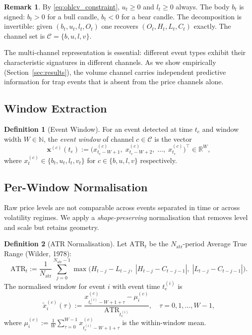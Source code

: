 \documentclass[11pt,a4paper]{article}
\theoremstyle{definition}
\newtheorem{definition}{Definition}[section]
\newtheorem{remark}{Remark}[section]
\theoremstyle{plain}
\newcommand{\R}{\mathbb{R}}
\newcommand{\N}{\mathbb{N}}
\newcommand{\bvec}[1]{\mathbf{#1}}
\begin{document}
\begin{remark}
By \eqref{eq:ohlcv_constraint}, $u_t \geq 0$ and $l_t \geq 0$ always. The
body $b_t$ is signed: $b_t > 0$ for a bull candle, $b_t < 0$ for a bear
candle. The decomposition is invertible: given $(b_t, u_t, l_t, O_t)$ one
recovers $(O_t, H_t, L_t, C_t)$ exactly. The channel set is
$\mathcal{C} = \{b, u, l, v\}$.
\end{remark}

The multi-channel representation is essential: different event types exhibit
their characteristic signatures in different channels. As we show
empirically (Section~\ref{sec:results}), the volume channel carries
independent predictive information for trap events that is absent from the
price channels alone.

\subsection{Window Extraction}

\begin{definition}[Event Window]
\label{def:window}
For an event detected at time $t_e$ and window width $W \in \N$, the
\emph{event window} of channel $c \in \mathcal{C}$ is the vector
\begin{equation}
    \bvec{x}^{(c)}(t_e) :=
    \bigl(x^{(c)}_{t_e - W + 1},\;
          x^{(c)}_{t_e - W + 2},\;
          \ldots,\;
          x^{(c)}_{t_e}\bigr)^\top
    \in \R^W,
    \label{eq:window_vector}
\end{equation}
where $x^{(c)}_t \in \{b_t, u_t, l_t, v_t\}$ for $c \in \{b, u, l, v\}$
respectively.
\end{definition}

\subsection{Per-Window Normalisation}
\label{sec:normalisation}

Raw price levels are not comparable across events separated in time or
across volatility regimes. We apply a \emph{shape-preserving} normalisation
that removes level and scale but retains geometry.

\begin{definition}[ATR Normalisation]
\label{def:normalisation}
Let $\mathrm{ATR}_t$ be the $N_{\mathrm{atr}}$-period Average True Range
(Wilder, 1978):
\begin{equation}
    \mathrm{ATR}_t :=
    \frac{1}{N_{\mathrm{atr}}}
    \sum_{j=0}^{N_{\mathrm{atr}}-1}
    \max\!\bigl(H_{t-j} - L_{t-j},\;
                |H_{t-j} - C_{t-j-1}|,\;
                |L_{t-j} - C_{t-j-1}|\bigr).
    \label{eq:atr}
\end{equation}
The normalised window for event $i$ with event time $t_e^{(i)}$ is
\begin{equation}
    \tilde{x}^{(c)}_i(\tau) :=
    \frac{x^{(c)}_{t_e^{(i)} - W + 1 + \tau} - \mu^{(c)}_i}
         {\mathrm{ATR}_{t_e^{(i)}}},
    \quad \tau = 0, 1, \ldots, W-1,
    \label{eq:normalised_window}
\end{equation}
where $\mu^{(c)}_i := \frac{1}{W}\sum_{\tau=0}^{W-1}
x^{(c)}_{t_e^{(i)}-W+1+\tau}$ is the within-window mean.
\end{definition}
\end{document}
